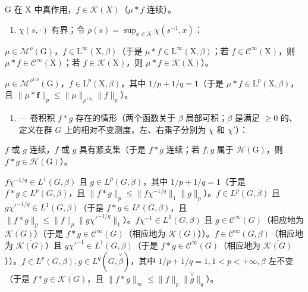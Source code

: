 G 在 X 中真作用，\(f \in \mathcal{K}(X)\)（\(\mu * f\) 连续）。

\begin{enumerate}
\def\labelenumi{(\alph{enumi})}
\setcounter{enumi}{1}
\tightlist
\item
  \(\chi(s, \cdot)\) 有界；令 \(\rho(s) = \sup_{x \in X} \chi(s^{-1}, x)\)：
\end{enumerate}

\(\mu \in \mathcal{M}^{\rho}(\mathrm{G})\)，\(f\in \mathrm{L}^{\infty}(\mathrm{X},\beta)\)（于是 \(\mu *f\in \mathrm{L}^{\infty}(\mathrm{X},\beta)\)；若 \(f\in \mathcal{C}^{\infty}(\mathrm{X})\)，则 \(\mu *f\in \mathcal{C}^{\infty}(\mathrm{X})\)；若 \(f\in \overline{\mathcal{K}(\mathrm{X})}\)，则 \(\mu *f\in \overline{\mathcal{K}(\mathrm{X})}\)）。

\(\mu \in \mathcal{M}^{\rho^{1 / q}}(\mathrm{G})\)，\(f\in \mathrm{L}^p (\mathrm{X},\beta)\)，其中 \(1 / p + 1 / q = 1\)（于是 \(\mu *f\in \mathrm{L}^p (\mathrm{X},\beta)\)，且 \(\| \mu *\boldsymbol {f}\| _p\leqslant \| \mu \|_{\rho^{1 / q}}\| f\| _p\)）。

\begin{enumerate}
\def\labelenumi{\Roman{enumi}.}
\setcounter{enumi}{2}
\tightlist
\item
  --- 卷积积 \(f * g\) 存在的情形（两个函数关于 \(\beta\) 局部可积；\(\beta\) 是满足 \(\geqslant 0\) 的、定义在群 \(G\) 上的相对不变测度，左、右乘子分别为 \(\chi\) 和 \(\chi'\)）：
\end{enumerate}

\(f\) 或 \(g\) 连续，\(f\) 或 \(g\) 具有紧支集（于是 \(f*g\) 连续；若 \(f,g\) 属于 \(\mathcal{H}(\mathrm{G})\)，则 \(f*g\in\mathcal{H}(\mathrm{G})\)）。

\(f\chi^{-1/q} \in L^{1}(G,\beta)\) 且 \(g \in L^{p}(G,\beta)\)，其中 \(1/p + 1/q = 1\)（于是 \(f*g \in L^{p}(G,\beta)\)，且 \(\|f*g\|_{p} \leqslant \|f\chi^{-1/q}\|_{1} \|g\|_{p}\)）。\(f \in L^{p}(G,\beta)\) 且 \(g\chi'^{-1/q} \in L^{1}(G,\beta)\)（于是 \(f*g \in L^{p}(G,\beta)\)，且 \(\|f*g\|_{p} \leqslant \|f\|_{p} \|g\chi'^{-1/q}\|_{1}\)）。\(f\chi^{-1} \in L^{1}(G,\beta)\) 且 \(g \in \mathcal{C}^{\infty}(G)\)（相应地为 \(\overline{\mathcal{K}(G)}\)）（于是 \(f*g \in \mathcal{C}^{\infty}(G)\)（相应地为 \(\overline{\mathcal{K}(G)}\)））。\(f \in \mathcal{C}^{\infty}(G,\beta)\)（相应地为 \(\overline{\mathcal{K}(G)}\)）且 \(g\chi'^{-1} \in L^{1}(G,\beta)\)（于是 \(f*g \in \mathcal{C}^{\infty}(G)\)（相应地为 \(\overline{\mathcal{K}(G)}\)））。\(f \in L^{p}(G,\beta), g \in L^{q}(G, \overset{\vee}{\beta})\)，其中 \(1/p + 1/q = 1, 1 < p < +\infty, \beta\) 左不变（于是 \(f*g \in \overline{\mathcal{K}(G)}\)，且 \(\|f*g\|_{\infty} \leqslant \|f\|_{p} \| \overset{\vee}{g}\|_{q}\)）。
